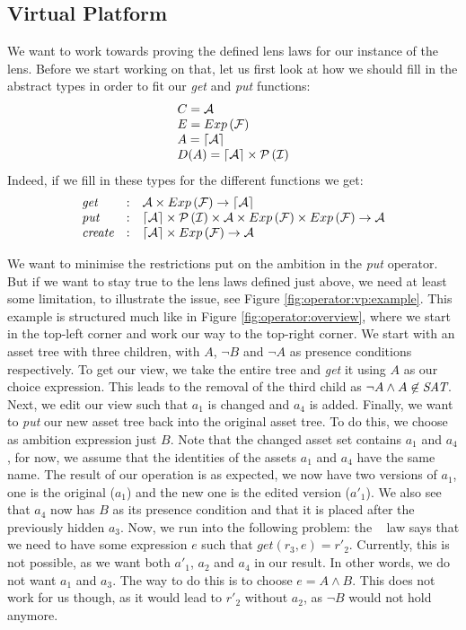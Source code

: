 \subsection*{Virtual Platform}\label{sec:configlenses:vp}
We want to work towards proving the defined lens laws for our instance of the
lens. Before we start working on that, let us first look at how we
should fill in the abstract types in order to fit our \emph{get} and \emph{put}
functions:
\[
  \begin{array}{l}
    C = \mathcal{A} \\
    E = Exp \left( \mathcal{F} \right) \\
    A = \lceil \mathcal{A} \rceil \\
    D(A) = \lceil \mathcal{A} \rceil \times \mathcal{P} \left(\mathcal{I}\right)
  \end{array}
\]
Indeed, if we fill in these types for the different functions we get:
\[
  \begin{array}{lll}
    \textit{get} & : & \mathcal{A} \times Exp \left( \mathcal{F} \right) \rightarrow \lceil \mathcal{A} \rceil \\
    \textit{put} & : & \lceil \mathcal{A} \rceil \times \mathcal{P} \left(\mathcal{I}\right) \times \mathcal{A} \times Exp \left( \mathcal{F} \right) \times Exp \left( \mathcal{F} \right) \rightarrow \mathcal{A} \\
    \textit{create} & : & \lceil \mathcal{A} \rceil \times Exp \left( \mathcal{F} \right) \rightarrow \mathcal{A}
  \end{array}
\]

We want to minimise the restrictions put on the ambition in the \emph{put}
operator. But if we want to stay true to the lens laws defined just above, we
need at least some limitation, to illustrate the issue, see Figure
\ref{fig:operator:vp:example}. This example is structured much like in Figure
\ref{fig:operator:overview}, where we start in the top-left corner and work our
way to the top-right corner. We start with an asset tree with three
children, with $A$, $\neg B$ and $\neg A$ as presence conditions respectively.
To get our view, we take the entire tree and \emph{get} it using $A$ as our
choice expression. This leads to the removal of the third child as 
$\neg A \land A \not\in \textit{SAT}$. Next, we edit our view such that $a_1$ is
changed and $a_4$ is added. Finally, we want to \emph{put} our new asset tree
back into the original asset tree. To do this, we choose as ambition expression
just $B$. Note that the changed asset set contains $a_1$ and $a_4$, for now, we
assume that the identities of the assets $a_1$ and $a_4$ have the same name.
The result of our operation is as expected, we now have two versions of $a_1$,
one is the original ($a_1$) and the new one is the edited version ($a'_1$). We
also see that $a_4$ now has $B$ as its presence condition and that it is placed
after the previously hidden $a_3$. Now, we run into the following problem: the
\putget~ law says that we need to have some expression $e$ such that
\(\textit{get}\left(r_3, e\right) = r'_2\). Currently, this is not possible, as
we want both $a'_1$, $a_2$ and $a_4$ in our result. In other words, we do not
want $a_1$ and $a_3$. The way to do this is to choose $e = A \land B$. This
does not work for us though, as it would lead to $r'_2$ without $a_2$, as 
$\neg B$ would not hold anymore.

